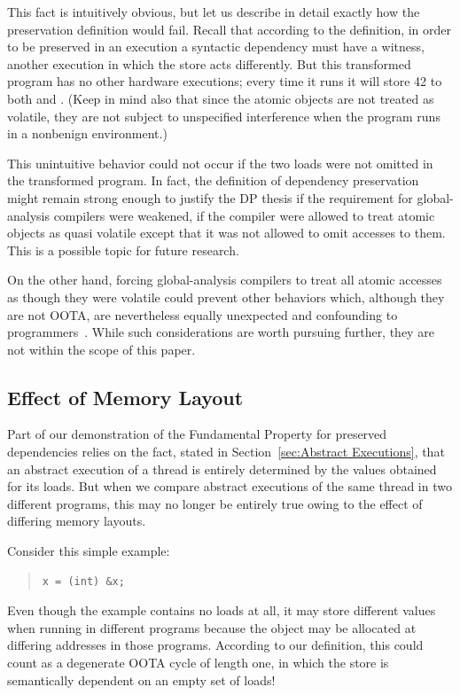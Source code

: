This fact is intuitively obvious, but let us describe in detail
exactly how the preservation definition would fail.
Recall that according to the definition, in order to be preserved in an execution
a syntactic dependency must have a witness,
another execution in which the store acts differently.
But this transformed program has no other hardware executions; every time it
runs it will store 42 to both  and .
(Keep in mind also that since the atomic objects are not treated as
volatile, they are not subject to unspecified interference when the
program runs in a nonbenign environment.)

This unintuitive behavior could not occur if the two loads were not
omitted in the transformed program.
In fact, the definition of dependency preservation might remain
strong enough to justify the DP thesis
if the requirement for global-analysis compilers
were weakened, if the compiler were allowed to treat atomic objects as
quasi volatile except that it was not allowed to omit accesses to them.
This is a possible topic for future research.

On the other hand, forcing global-analysis compilers to treat all atomic
accesses as though they were volatile could prevent other behaviors
which, although they are not OOTA, are nevertheless equally unexpected
and confounding to
programmers~\cite[Appendix D.2]{PaulEMcKenney2023P3046R2/OOTAwithoutTrying}.
While such considerations are worth pursuing further, they are not within
the scope of this paper.

\subsection{Effect of Memory Layout}
\label{sec:Effect of Memory Layout}

Part of our demonstration of the Fundamental Property for preserved
dependencies relies on the fact, stated in
Section~\ref{sec:Abstract Executions},
that an abstract execution of a thread is entirely determined by the
values obtained for its loads.
But when we compare abstract executions of the same thread in two
different programs, this may no longer be entirely true owing to the
effect of differing memory layouts.

Consider this simple example:
\begin{quote}
\begin{verbatim}
x = (int) &x;
\end{verbatim}
\end{quote}
Even though the example contains no loads at all, it may store
different values when running in different programs because the
object  may be allocated at differing addresses in those
programs.
According to our definition, this could count as a degenerate OOTA
cycle of length one, in which the store is semantically dependent on
an empty set of loads!

